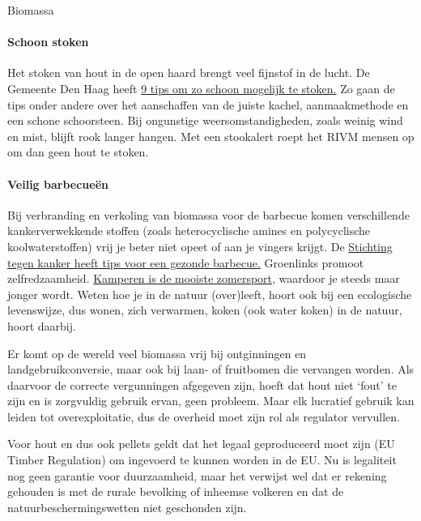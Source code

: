 \begin{voorstel}{Biomassa}
\begin{multicols*}{2}
\begin{overwegingen}
\paragraph{Schoon stoken}
Het stoken van hout in de open haard brengt veel fijnstof in de lucht. De Gemeente Den Haag heeft \href{https://www.denhaag.nl/nl/in-de-stad/natuur-en-milieu/duurzaamheid/verstandig-hout-stoken.htm}{9 tips om zo schoon mogelijk te stoken.} Zo gaan de tips onder andere over het aanschaffen van de juiste kachel, aanmaakmethode en een schone schoorsteen. Bij ongunstige weersomstandigheden, zoals weinig wind en mist, blijft rook langer hangen. Met een stookalert roept het RIVM mensen op om dan geen hout te stoken.

\paragraph{Veilig barbecueën}
Bij verbranding en verkoling van biomassa voor de barbecue komen verschillende kankerverwekkende stoffen (zoals heterocyclische amines en polycyclische koolwaterstoffen) vrij je beter niet opeet of aan je vingers krijgt. De \href{https://www.kanker.be/alles-over-kanker/aantoonbaar-risico/tips-om-gezonder-te-barbecue-n}{Stichting tegen kanker heeft tips voor een gezonde barbecue.} Groenlinks promoot zelfredzaamheid. \href{https://www.kanker.be/alles-over-kanker/aantoonbaar-risico/tips-om-gezonder-te-barbecue-n}{Kamperen is de mooiste zomersport,} waardoor je steeds maar jonger wordt. Weten hoe je in de natuur (over)leeft, hoort ook bij een ecologische levenswijze, dus wonen, zich verwarmen, koken (ook water koken) in de natuur, hoort daarbij.

\end{overwegingen}

\begin{aanbevelingen}
Er komt op de wereld veel biomassa vrij bij ontginningen en landgebruikconversie, maar ook bij laan- of fruitbomen die vervangen worden. Als daarvoor de correcte vergunningen afgegeven zijn, hoeft dat hout niet ‘fout’ te zijn en is zorgvuldig gebruik ervan, geen probleem. Maar elk lucratief gebruik kan leiden tot overexploitatie, dus de overheid moet zijn rol als regulator vervullen.

Voor hout en dus ook pellets geldt dat  het legaal geproduceerd moet zijn (EU Timber Regulation) om ingevoerd te kunnen worden in de EU. Nu is legaliteit nog geen garantie voor duurzaamheid, maar het verwijst wel dat er rekening gehouden is met de rurale bevolking of inheemse volkeren en dat de natuurbeschermingswetten niet geschonden zijn.


\end{aanbevelingen}
\end{multicols*}
\end{voorstel}
